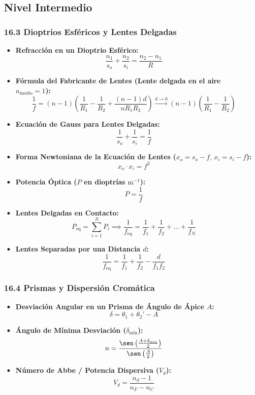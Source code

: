\documentclass[11pt,a4paper]{article}
\begin{document}
\subsection*{Nivel Intermedio}

\subsubsection*{16.3 Dioptrios Esféricos y Lentes Delgadas}

\begin{itemize}
  \item \textbf{Refracción en un Dioptrio Esférico:}
  \[
    \frac{n_1}{s_o} + \frac{n_2}{s_i} = \frac{n_2 - n_1}{R}
  \]
  \item \textbf{Fórmula del Fabricante de Lentes (Lente delgada en el aire $n_{\text{medio}} = 1$):}
  \[
    \frac{1}{f} = (n - 1)\left( \frac{1}{R_1} - \frac{1}{R_2} + \frac{(n - 1)d}{n R_1 R_2} \right) \xrightarrow{d \to 0} (n - 1)\left( \frac{1}{R_1} - \frac{1}{R_2} \right)
  \]
  \item \textbf{Ecuación de Gauss para Lentes Delgadas:}
  \[
    \frac{1}{s_o} + \frac{1}{s_i} = \frac{1}{f}
  \]
  \item \textbf{Forma Newtoniana de la Ecuación de Lentes ($x_o = s_o - f, \, x_i = s_i - f$):}
  \[
    x_o \cdot x_i = f^2
  \]
  \item \textbf{Potencia Óptica ($P$ en dioptrías $\text{m}^{-1}$):}
  \[
    P = \frac{1}{f}
  \]
  \item \textbf{Lentes Delgadas en Contacto:}
  \[
    P_{\text{eq}} = \sum_{i=1}^N P_i \implies \frac{1}{f_{\text{eq}}} = \frac{1}{f_1} + \frac{1}{f_2} + \dots + \frac{1}{f_N}
  \]
  \item \textbf{Lentes Separadas por una Distancia $d$:}
  \[
    \frac{1}{f_{\text{eq}}} = \frac{1}{f_1} + \frac{1}{f_2} - \frac{d}{f_1 f_2}
  \]
\end{itemize}

\subsubsection*{16.4 Prismas y Dispersión Cromática}

\begin{itemize}
  \item \textbf{Desviación Angular en un Prisma de Ángulo de Ápice $A$:}
  \[
    \delta = \theta_1 + \theta_2' - A
  \]
  \item \textbf{Ángulo de Mínima Desviación ($\delta_{\min}$):}
  \[
    n = \frac{\sen\left( \frac{A + \delta_{\min}}{2} \right)}{\sen\left( \frac{A}{2} \right)}
  \]
  \item \textbf{Número de Abbe / Potencia Dispersiva ($V_d$):}
  \[
    V_d = \frac{n_d - 1}{n_F - n_C}
  \]
\end{itemize}
\end{document}
